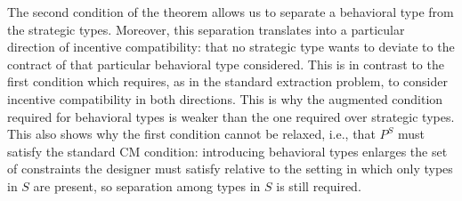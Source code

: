 \documentclass[12pt]{article}
\begin{document}
The second condition of the theorem allows us to separate a behavioral type from the strategic types. Moreover, this separation translates into a particular direction of incentive compatibility: that no strategic type wants to deviate to the contract of that particular behavioral type considered. This is in contrast to the first condition which requires, as in the standard extraction problem, to consider incentive compatibility in both directions. This is why the augmented condition required for behavioral types is weaker than the one required over strategic types. This also shows why the first condition cannot be relaxed, i.e., that $P^S$ must satisfy the standard CM condition: introducing behavioral types enlarges the set of constraints the designer must satisfy relative to the setting in which only types in $S$ are present, so separation among types in $S$ is still required. %



\end{document}
